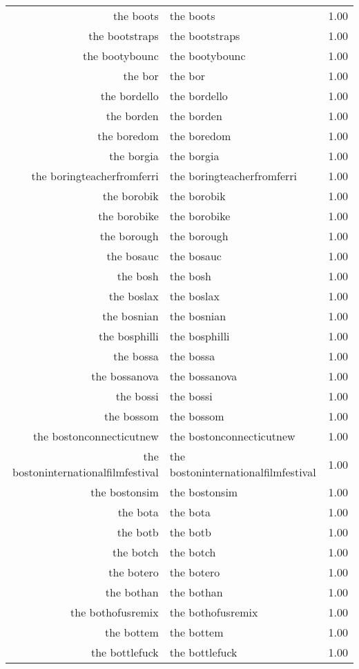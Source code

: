 \begin{table}[ht]
\begin{tabular}{rlr}
  the boots & the boots & 1.00 \\ 
  the bootstraps & the bootstraps & 1.00 \\ 
  the bootybounc & the bootybounc & 1.00 \\ 
  the bor & the bor & 1.00 \\ 
  the bordello & the bordello & 1.00 \\ 
  the borden & the borden & 1.00 \\ 
  the boredom & the boredom & 1.00 \\ 
  the borgia & the borgia & 1.00 \\ 
  the boringteacherfromferri & the boringteacherfromferri & 1.00 \\ 
  the borobik & the borobik & 1.00 \\ 
  the borobike & the borobike & 1.00 \\ 
  the borough & the borough & 1.00 \\ 
  the bosauc & the bosauc & 1.00 \\ 
  the bosh & the bosh & 1.00 \\ 
  the boslax & the boslax & 1.00 \\ 
  the bosnian & the bosnian & 1.00 \\ 
  the bosphilli & the bosphilli & 1.00 \\ 
  the bossa & the bossa & 1.00 \\ 
  the bossanova & the bossanova & 1.00 \\ 
  the bossi & the bossi & 1.00 \\ 
  the bossom & the bossom & 1.00 \\ 
  the bostonconnecticutnew & the bostonconnecticutnew & 1.00 \\ 
  the bostoninternationalfilmfestival & the bostoninternationalfilmfestival & 1.00 \\ 
  the bostonsim & the bostonsim & 1.00 \\ 
  the bota & the bota & 1.00 \\ 
  the botb & the botb & 1.00 \\ 
  the botch & the botch & 1.00 \\ 
  the botero & the botero & 1.00 \\ 
  the bothan & the bothan & 1.00 \\ 
  the bothofusremix & the bothofusremix & 1.00 \\ 
  the bottem & the bottem & 1.00 \\ 
  the bottlefuck & the bottlefuck & 1.00 \\ 

\end{tabular}
\end{table}

